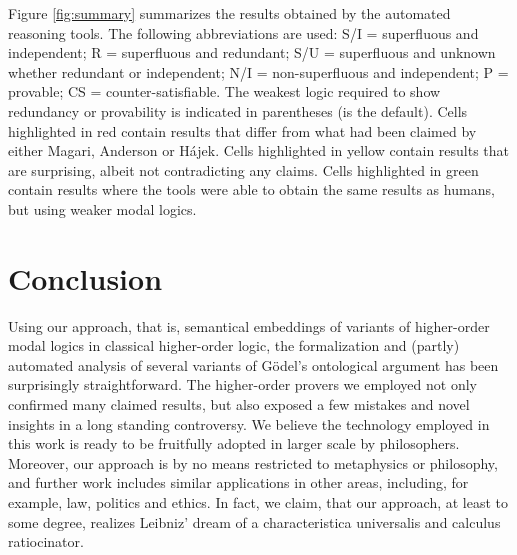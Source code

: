 \documentclass{birkjour}
\theoremstyle{definition}
\theoremstyle{remark}
\numberwithin{equation}{section}
\begin{document}
Figure \ref{fig:summary} summarizes the results obtained by the
automated reasoning tools. The following abbreviations are used: S/I =
superfluous and independent; R = superfluous and redundant; S/U =
superfluous and unknown whether redundant or independent; N/I =
non-superfluous and independent; P = provable; CS =
counter-satisfiable. The weakest logic required to show redundancy or
provability is indicated in parentheses (\K is the default).  Cells
highlighted in \colorbox{\tabred}{red} contain results that differ
from what had been claimed by either Magari, Anderson or Hájek. Cells
highlighted in \colorbox{\tabyellow}{yellow} contain results that are
surprising, albeit not contradicting any claims. Cells highlighted in
\colorbox{\tabgreen}{green} contain results where the tools were able
to obtain the same results as humans, but using weaker modal logics.


\section{Conclusion}
Using our approach, that is, semantical embeddings of variants of higher-order
modal logics in classical higher-order logic, the formalization and
(partly) automated analysis of several variants of G\"odel's
ontological argument has been surprisingly straightforward. The
higher-order provers we employed not only confirmed many claimed results, but also exposed a
few mistakes and novel insights in a long standing controversy.  We
believe the technology employed in this work is ready to be fruitfully
adopted in larger scale by philosophers.  Moreover, our approach is
by no means restricted to metaphysics or philosophy, and further work
includes similar applications in other areas, including, for example,
law, politics and ethics. In fact, we claim, that our approach, at
least to some degree, realizes Leibniz' dream of a characteristica universalis
and calculus ratiocinator.







\sloppy
\printbibliography



\end{document}
